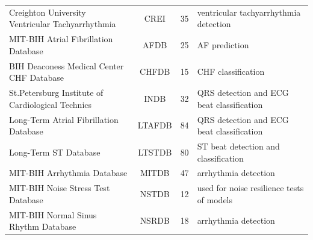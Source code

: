 \documentclass[journal]{IEEEtran}
\begin{document}
\begin{table}[!t]
\begin{minipage}{\textwidth}
\begin{tabularx}{\textwidth}{l c r l}
			Creighton University Ventricular Tachyarrhythmia\cite{nolle1986crei}                          & CREI            & 35                                                                                & ventricular tachyarrhythmia detection                        \\
			MIT-BIH Atrial Fibrillation Database\cite{moody1983new}                                        & AFDB            & 25                                                                                & AF prediction                                                \\
			BIH Deaconess Medical Center CHF Database\cite{baim1986survival}                              & CHFDB           & 15                                                                                & CHF classification                                           \\
			St.Petersburg Institute of Cardiological Technics\cite{goldberger2000physiobank}               & INDB            & 32                                                                                & QRS detection and ECG beat classification                    \\
			Long-Term Atrial Fibrillation Database\cite{petrutiu2007abrupt}                                & LTAFDB          & 84                                                                                & QRS detection and ECG beat classification                    \\
			Long-Term ST Database\cite{jager2003long}                                                     & LTSTDB          & 80                                                                                & ST beat detection and classification                         \\
			MIT-BIH Arrhythmia Database\cite{moody2001impact}                                             & MITDB           & 47                                                                                & arrhythmia detection                                         \\
			MIT-BIH Noise Stress Test Database\cite{moody1984noise}                                       & NSTDB           & 12                                                                                & used for noise resilience tests of models                    \\
			MIT-BIH Normal Sinus Rhythm Database\cite{goldberger2000physiobank}                           & NSRDB           & 18                                                                                & arrhythmia detection                                         \\

\end{tabularx}
\end{minipage}
\end{table}
\end{document}
